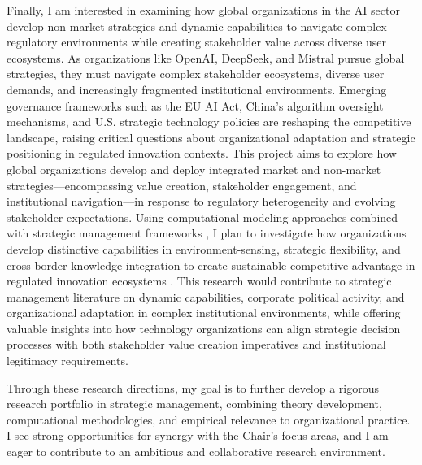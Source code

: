 \documentclass[11pt,a4paper]{article}
\begin{document}
Finally, I am interested in examining how global organizations in the AI sector develop non-market strategies and dynamic capabilities to navigate complex regulatory environments while creating stakeholder value across diverse user ecosystems.
As organizations like OpenAI, DeepSeek, and Mistral pursue global strategies, they must navigate complex stakeholder ecosystems, diverse user demands, and increasingly fragmented institutional environments. 
Emerging governance frameworks such as the EU AI Act, China's algorithm oversight mechanisms, and U.S. strategic technology policies are reshaping the competitive landscape, raising critical questions about organizational adaptation and strategic positioning in regulated innovation contexts. This project aims to explore how global organizations develop and deploy integrated market and non-market strategies—encompassing value creation, stakeholder engagement, and institutional navigation—in response to regulatory heterogeneity and evolving stakeholder expectations. Using computational modeling approaches combined with strategic management frameworks \parencite{Teece1997DynamicManagement, Barney1991FirmAdvantage}, I plan to investigate how organizations develop distinctive capabilities in environment-sensing, strategic flexibility, and cross-border knowledge integration to create sustainable competitive advantage in regulated innovation ecosystems \parencite{Parker2017PlatformEcosystems}. This research would contribute to strategic management literature on dynamic capabilities, corporate political activity, and organizational adaptation in complex institutional environments, while offering valuable insights into how technology organizations can align strategic decision processes with both stakeholder value creation imperatives and institutional legitimacy requirements.

Through these research directions, my goal is to further develop a rigorous research portfolio in strategic management, combining theory development, computational methodologies, and empirical relevance to organizational practice. I see strong opportunities for synergy with the Chair's focus areas, and I am eager to contribute to an ambitious and collaborative research environment.

% 
\printbibliography
\end{document}
